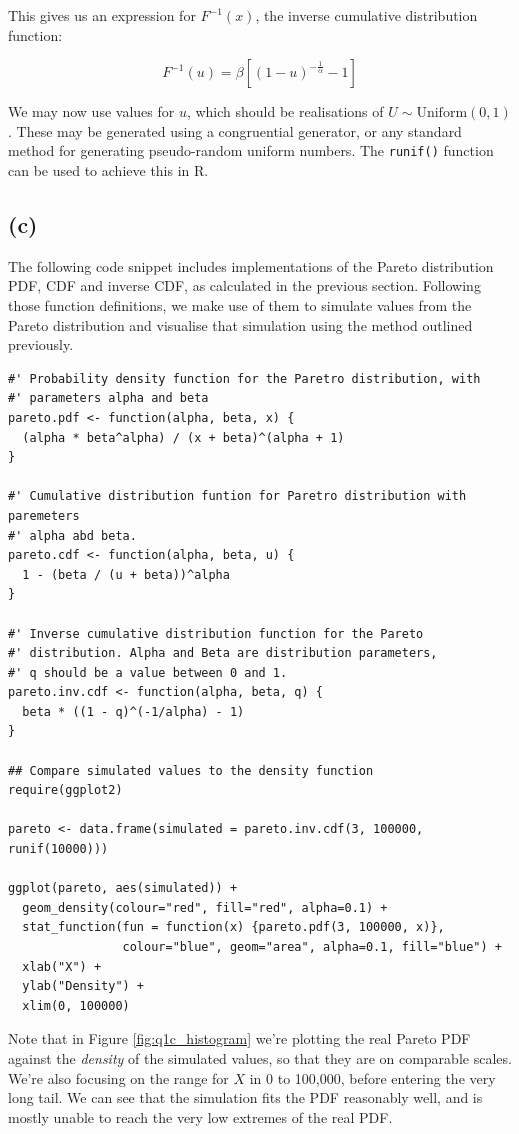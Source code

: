 \documentclass{article}
\begin{document}
This gives us an expression for $F^{-1}(x)$, the inverse cumulative
distribution function:

\[
  F^{-1}(u) = \beta \left[{ \left( 1 - u \right)}^{-\frac{1}{\alpha}}
    - 1 \right]
\]

We may now use values for $u$, which should be realisations of  $U
\sim \mathrm{Uniform}(0, 1)$. These may be generated using a
congruential generator, or any standard method for generating
pseudo-random uniform numbers. The \texttt{runif()} function can be
used to achieve this in R.

\subsection*{(c)}

The following code snippet includes implementations of the Pareto
distribution PDF, CDF and inverse CDF, as calculated in the previous
section. Following those function definitions, we make use of them to
simulate values from the Pareto distribution and visualise that
simulation using the method outlined previously.

\begin{verbatim}
#' Probability density function for the Paretro distribution, with
#' parameters alpha and beta
pareto.pdf <- function(alpha, beta, x) {
  (alpha * beta^alpha) / (x + beta)^(alpha + 1)
}

#' Cumulative distribution funtion for Paretro distribution with paremeters
#' alpha abd beta.
pareto.cdf <- function(alpha, beta, u) {
  1 - (beta / (u + beta))^alpha
}

#' Inverse cumulative distribution function for the Pareto
#' distribution. Alpha and Beta are distribution parameters,
#' q should be a value between 0 and 1.
pareto.inv.cdf <- function(alpha, beta, q) {
  beta * ((1 - q)^(-1/alpha) - 1)
}

## Compare simulated values to the density function
require(ggplot2)

pareto <- data.frame(simulated = pareto.inv.cdf(3, 100000, runif(10000)))

ggplot(pareto, aes(simulated)) +
  geom_density(colour="red", fill="red", alpha=0.1) +
  stat_function(fun = function(x) {pareto.pdf(3, 100000, x)},
                colour="blue", geom="area", alpha=0.1, fill="blue") +
  xlab("X") +
  ylab("Density") +
  xlim(0, 100000)
\end{verbatim}

Note that in Figure \ref{fig:q1c_histogram} we're plotting the real
Pareto PDF against the \emph{density} of the simulated values, so that
they are on comparable scales. We're also focusing on the range for
$X$ in 0 to 100,000, before entering the very long tail. We can see
that the simulation fits the PDF reasonably well, and is mostly unable
to reach the very low extremes of the real PDF.
\end{document}
